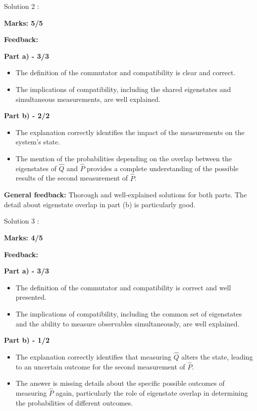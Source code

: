 \documentclass[a4paper,11pt]{article}
\begin{document}
Solution 2 :

\textbf{Marks: 5/5}

\textbf{Feedback:}

\textbf{Part a) - 3/3}

\begin{itemize}
    \item The definition of the commutator and compatibility is clear and correct.
    \item The implications of compatibility, including the shared eigenstates and simultaneous measurements, are well explained.
\end{itemize}

\textbf{Part b) - 2/2}

\begin{itemize}
    \item The explanation correctly identifies the impact of the measurements on the system's state.
    \item The mention of the probabilities depending on the overlap between the eigenstates of $\hat{Q}$ and $\hat{P}$ provides a complete understanding of the possible results of the second measurement of $\hat{P}$.
\end{itemize}

\textbf{General feedback:}
Thorough and well-explained solutions for both parts. The detail about eigenstate overlap in part (b) is particularly good.



Solution 3 :

\textbf{Marks: 4/5}

\textbf{Feedback:}

\textbf{Part a) - 3/3}

\begin{itemize}
    \item The definition of the commutator and compatibility is correct and well presented.
    \item The implications of compatibility, including the common set of eigenstates and the ability to measure observables simultaneously, are well explained.
\end{itemize}

\textbf{Part b) - 1/2}

\begin{itemize}
    \item The explanation correctly identifies that measuring $\hat{Q}$ alters the state, leading to an uncertain outcome for the second measurement of $\hat{P}$.
    \item The answer is missing details about the specific possible outcomes of measuring $\hat{P}$ again, particularly the role of eigenstate overlap in determining the probabilities of different outcomes.
\end{itemize}
\end{document}
